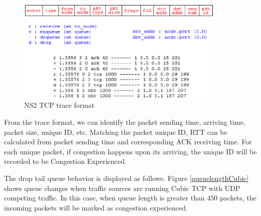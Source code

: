 \begin{figure}
\centering
\includegraphics[width=10cm]{format.eps}
\caption{NS2 TCP trace format}
\label{NS2Format}
\end{figure}
From the trace format, we can identify the packet sending time, arriving time, packet size, unique ID, etc. Matching the packet unique ID, RTT can be calculated from packet sending time and corresponding ACK receiving time. For each unique packet, if congestion happens upon its arriving, the unique ID will be recorded to be Congestion Experienced.

\par The drop tail queue behavior is displayed as follows.
Figure \ref{queuelengthCubic} shows queue changes when traffic sources are running Cubic TCP with UDP competing traffic. 
In this case, when queue length is greater than $450$ packets, the incoming packets will be marked as congestion experienced.


